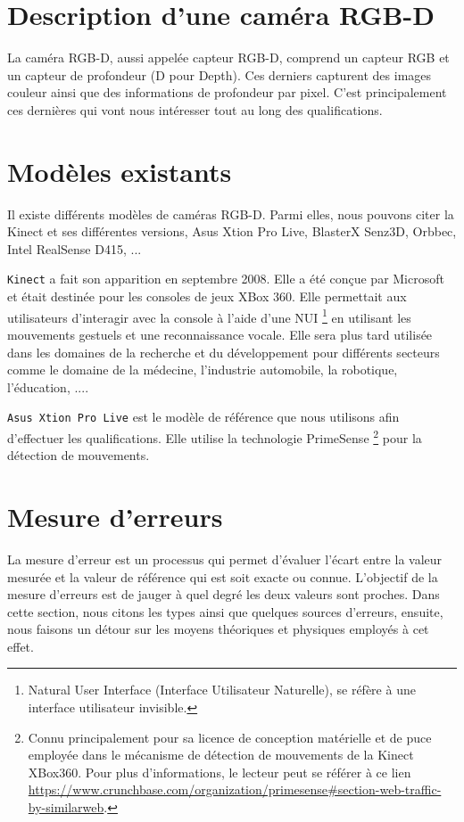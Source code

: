 \documentclass[a4paper, 12pt]{book}
\begin{document}
\section{Description d'une caméra RGB-D}

La caméra RGB-D, aussi appelée capteur RGB-D, comprend un capteur RGB et un capteur de profondeur (D pour Depth). Ces derniers capturent des images couleur ainsi que des informations de profondeur par pixel. C'est principalement ces dernières qui vont nous intéresser tout au long des qualifications.


\section{Modèles existants}
Il existe différents modèles de caméras RGB-D. Parmi elles, nous pouvons citer la Kinect et ses différentes versions, Asus Xtion Pro Live, BlasterX Senz3D, Orbbec, Intel RealSense D415, ... 
\par \texttt{Kinect} a fait son apparition en septembre 2008. Elle a été conçue par Microsoft et était destinée pour les consoles de jeux XBox 360. Elle permettait aux utilisateurs d'interagir avec la console à l'aide d'une NUI \footnote{Natural User Interface (Interface Utilisateur Naturelle), se réfère à une interface utilisateur invisible.} en utilisant les mouvements gestuels et une reconnaissance vocale. Elle sera plus tard utilisée dans les domaines de la  recherche et du développement pour différents secteurs comme le domaine de la médecine, l'industrie automobile, la robotique, l'éducation,  .... 
\par \texttt{Asus Xtion Pro Live} est le modèle de référence que nous utilisons afin d'effectuer les qualifications. Elle utilise la technologie PrimeSense  \footnote{Connu principalement pour sa licence de conception matérielle et de puce employée dans le mécanisme de détection de mouvements de la Kinect XBox360. Pour plus d'informations, le lecteur peut se référer à ce lien \url{https://www.crunchbase.com/organization/primesense#section-web-traffic-by-similarweb}.} pour la détection de mouvements.



\section{Mesure d'erreurs}
La mesure d'erreur est un processus qui permet d'évaluer l'écart entre la valeur mesurée et la valeur de référence qui est soit exacte ou connue. L'objectif de la mesure d'erreurs est de jauger à quel degré les deux valeurs sont proches. 
Dans cette section, nous citons les types ainsi que quelques sources d'erreurs, ensuite,  nous faisons un détour sur les moyens théoriques et physiques employés à cet effet.
\end{document}
